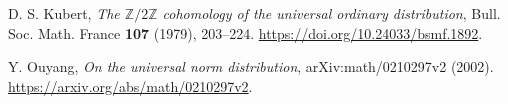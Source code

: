 D. S. Kubert, \emph{The $\mathbb Z/2\mathbb Z$ cohomology of the universal
ordinary distribution}, Bull. Soc. Math. France \textbf{107} (1979), 203--224.
\url{https://doi.org/10.24033/bsmf.1892}.

Y. Ouyang, \emph{On the universal norm distribution},
arXiv:math/0210297v2 (2002).
\url{https://arxiv.org/abs/math/0210297v2}.

